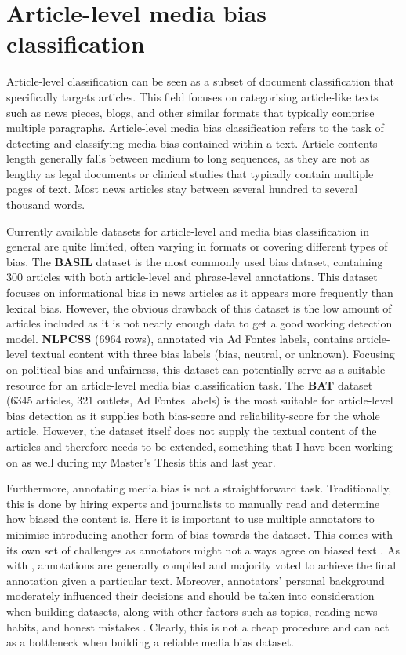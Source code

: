 \section{Article-level media bias classification}

Article-level classification can be seen as a subset of document classification that specifically targets articles. This field focuses on categorising article-like texts such as news pieces, blogs, and other similar formats that typically comprise multiple paragraphs. Article-level media bias classification refers to the task of detecting and classifying media bias contained within a text. Article contents length generally falls between medium to long sequences, as they are not as lengthy as legal documents or clinical studies that typically contain multiple pages of text. Most news articles stay between several hundred to several thousand words.

Currently available datasets for article-level and media bias classification in general are quite limited, often varying in formats or covering different types of bias. The \textbf{BASIL} dataset \cite{fan-2019-basil} is the most commonly used bias dataset, containing 300 articles with both article-level and phrase-level annotations. This dataset focuses on informational bias in news articles as it appears more frequently than lexical bias. However, the obvious drawback of this dataset is the low amount of articles included as it is not nearly enough data to get a good working detection model. \textbf{NLPCSS} \cite{chen-2020-nlpcss} (6964 rows), annotated via Ad Fontes labels, contains article-level textual content with three bias labels (bias, neutral, or unknown). Focusing on political bias and unfairness, this dataset can potentially serve as a suitable resource for an article-level media bias classification task. The \textbf{BAT} \cite{spinde-2023-bat} dataset (6345 articles, 321 outlets, Ad Fontes labels) is the most suitable for article-level bias detection as it supplies both bias-score and reliability-score for the whole article. However, the dataset itself does not supply the textual content of the articles and therefore needs to be extended, something that I have been working on as well during my Master's Thesis this and last year.

Furthermore, annotating media bias is not a straightforward task. Traditionally, this is done by hiring experts and journalists to manually read and determine how biased the content is. Here it is important to use multiple annotators to minimise introducing another form of bias towards the dataset. This comes with its own set of challenges as annotators might not always agree on biased text \cite{lim-2018-understanding}. As with \cite{spinde-2021-babe}, annotations are generally compiled and majority voted to achieve the final annotation given a particular text. Moreover, annotators' personal background moderately influenced their decisions and should be taken into consideration when building datasets, along with other factors such as topics, reading news habits, and honest mistakes \cite{spinde-2021-bias-words}. Clearly, this is not a cheap procedure and can act as a bottleneck when building a reliable media bias dataset.

